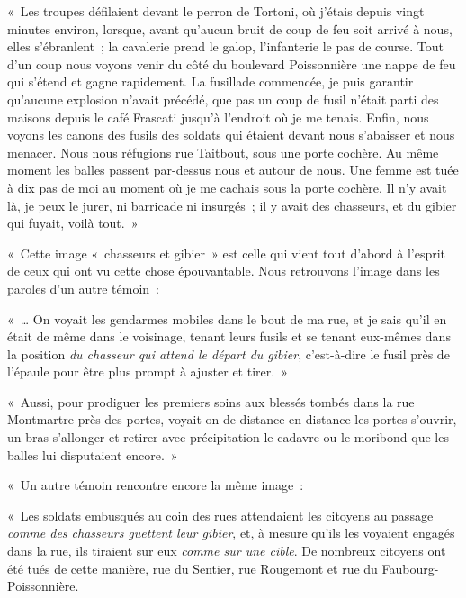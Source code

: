 \documentclass[french,twoside]{book} %
\newenvironment{quoteblock}%
  {\begin{quoting}}
  {\end{quoting}}
\newenvironment{quotebar}{%
    \def\FrameCommand{{\color{rubric!10!}\vrule width 0.5em} \hspace{0.9em}}%
    \def\OuterFrameSep{0pt} %
    \MakeFramed {\advance\hsize-\width \FrameRestore}
  }%
  {%
    \endMakeFramed
  }
\renewenvironment{quoteblock}%
  {%
    \savenotes
    \setstretch{0.9}
    \begin{quotebar}
    \smallskip
  }
  {%
    \smallskip
    \end{quotebar}
    \spewnotes
  }
\begin{document}
\begin{quoteblock}
 \noindent « Les troupes défilaient devant le perron de Tortoni, où j’étais depuis vingt minutes environ, lorsque, avant qu’aucun bruit de coup de feu soit arrivé à nous, elles s’ébranlent ; la cavalerie prend le galop, l’infanterie le pas de course. Tout d’un coup nous voyons venir du côté du boulevard Poissonnière une nappe de feu qui s’étend et gagne rapidement. La fusillade commencée, je puis garantir qu’aucune explosion n’avait précédé, que pas un coup de fusil n’était parti des maisons depuis le café Frascati jusqu’à l’endroit où je me tenais. Enfin, nous voyons les canons des fusils des soldats qui étaient devant nous s’abaisser et nous menacer. Nous nous réfugions rue Taitbout, sous une porte cochère. Au même moment les balles passent par-dessus nous et autour de nous. Une femme est tuée à dix pas de moi au moment où je me cachais sous la porte cochère. Il n’y avait là, je peux le jurer, ni barricade ni insurgés ; il y avait des chasseurs, et du gibier qui fuyait, voilà tout. »
 \end{quoteblock}

\noindent « Cette image « chasseurs et gibier » est celle qui vient tout d’abord à l’esprit de ceux qui ont vu cette chose épouvantable. Nous retrouvons l’image dans les paroles d’un autre témoin :\par

\begin{quoteblock}
 \noindent « … On voyait les gendarmes mobiles dans le bout de ma rue, et je sais qu’il en était de même dans le voisinage, tenant leurs fusils et se tenant eux-mêmes dans la position \emph{du chasseur qui attend le départ du gibier}, c’est-à-dire le fusil près de l’épaule pour être plus prompt à ajuster et tirer. »\par
 « Aussi, pour prodiguer les premiers soins aux blessés tombés dans la rue Montmartre près des portes, voyait-on de distance en distance les portes s’ouvrir, un bras s’allonger et retirer avec précipitation le cadavre ou le moribond que les balles lui disputaient encore. »
 \end{quoteblock}

« Un autre témoin rencontre encore la même image :\par

\begin{quoteblock}
 \noindent « Les soldats embusqués au coin des rues attendaient les citoyens au passage \emph{comme des chasseurs guettent leur gibier}, et, à mesure qu’ils les voyaient engagés dans la rue, ils tiraient sur eux \emph{comme sur une cible}. De nombreux citoyens ont été tués de cette manière, rue du Sentier, rue Rougemont et rue du Faubourg-Poissonnière.
 \end{quoteblock}
\end{document}
